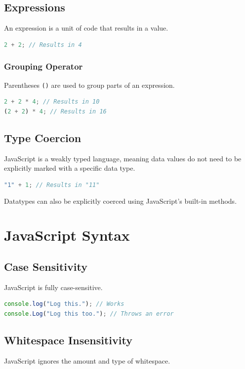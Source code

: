 \documentclass[a4paper,12pt]{article}
\begin{document}
\subsection{Expressions}
An expression is a unit of code that results in a value.

\begin{lstlisting}[language=JavaScript, caption=Example of an Expression]
2 + 2; // Results in 4
\end{lstlisting}

\subsubsection{Grouping Operator}
Parentheses \texttt{()} are used to group parts of an expression.

\begin{lstlisting}[language=JavaScript, caption=Grouping Operator Example]
2 + 2 * 4; // Results in 10
(2 + 2) * 4; // Results in 16
\end{lstlisting}

\subsection{Type Coercion}
JavaScript is a weakly typed language, meaning data values do not need to be explicitly marked with a specific data type.

\begin{lstlisting}[language=JavaScript, caption=Example of Weak Typing]
"1" + 1; // Results in "11"
\end{lstlisting}

Datatypes can also be explicitly coerced using JavaScript's built-in methods.

\section{JavaScript Syntax}
\subsection{Case Sensitivity}
JavaScript is fully case-sensitive.

\begin{lstlisting}[language=JavaScript, caption=Case Sensitivity Example]
console.log("Log this."); // Works
console.Log("Log this too."); // Throws an error
\end{lstlisting}

\subsection{Whitespace Insensitivity}
JavaScript ignores the amount and type of whitespace.
\end{document}
